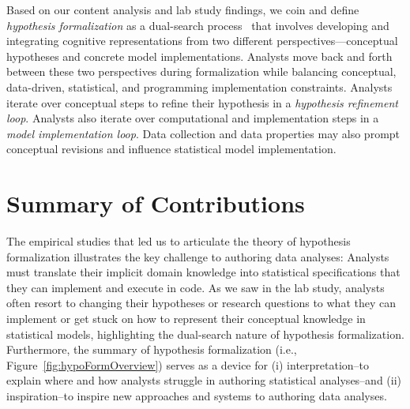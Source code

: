 Based on our content analysis and lab study findings, we coin and define
\textit{hypothesis formalization} as a dual-search process~\cite{klahr1988dual}
that involves developing and integrating cognitive representations from two
different perspectives---conceptual hypotheses and concrete model
implementations. Analysts move back and forth between these two perspectives
during formalization while balancing conceptual, data-driven, statistical, and
programming implementation constraints. Analysts iterate over conceptual steps
to refine their hypothesis in a \textit{hypothesis refinement loop}. Analysts
also iterate over computational and implementation steps in a \textit{model
implementation loop}. Data collection and data properties may also prompt
conceptual revisions and influence statistical model implementation.













\section{Summary of Contributions}


The empirical studies that led us to articulate the theory of hypothesis
formalization illustrates the key challenge to authoring data analyses: Analysts
must translate their implicit domain knowledge into statistical specifications
that they can implement and execute in code. As we saw in the lab study,
analysts often resort to changing their hypotheses or research questions to what
they can implement or get stuck on how to represent their conceptual knowledge
in statistical models, highlighting the dual-search nature of hypothesis
formalization. Furthermore, the summary of hypothesis formalization (i.e.,
Figure~\ref{fig:hypoFormOverview}) serves as a device for (i) interpretation--to
explain where and how analysts struggle in authoring statistical analyses--and
(ii) inspiration--to inspire new approaches and systems to authoring data
analyses. 

